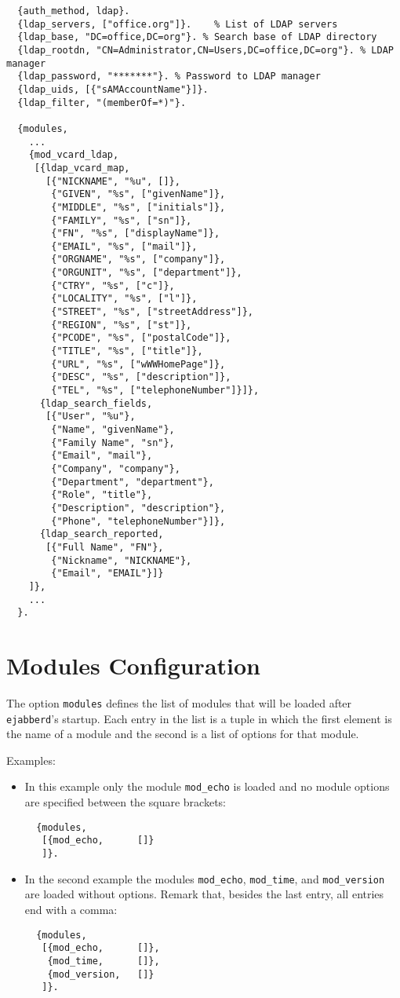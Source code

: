 \documentclass[a4paper,10pt]{book}
\newcommand{\ind}[1]{\begin{latexonly}\index{#1}\end{latexonly}}
\newcommand{\term}[1]{\texttt{#1}}
\newcommand{\ejabberd}{\texttt{ejabberd}}
\newcommand{\module}[1]{\texttt{#1}}
\newcommand{\modecho}{\module{mod\_echo}}
\newcommand{\modtime}{\module{mod\_time}}
\newcommand{\modversion}{\module{mod\_version}}
\begin{document}
\begin{verbatim}
  {auth_method, ldap}.
  {ldap_servers, ["office.org"]}.    % List of LDAP servers
  {ldap_base, "DC=office,DC=org"}. % Search base of LDAP directory
  {ldap_rootdn, "CN=Administrator,CN=Users,DC=office,DC=org"}. % LDAP manager
  {ldap_password, "*******"}. % Password to LDAP manager
  {ldap_uids, [{"sAMAccountName"}]}.
  {ldap_filter, "(memberOf=*)"}.

  {modules,
    ...
    {mod_vcard_ldap,
     [{ldap_vcard_map,
       [{"NICKNAME", "%u", []},
        {"GIVEN", "%s", ["givenName"]},
        {"MIDDLE", "%s", ["initials"]},
        {"FAMILY", "%s", ["sn"]},
        {"FN", "%s", ["displayName"]},
        {"EMAIL", "%s", ["mail"]},
        {"ORGNAME", "%s", ["company"]},
        {"ORGUNIT", "%s", ["department"]},
        {"CTRY", "%s", ["c"]},
        {"LOCALITY", "%s", ["l"]},
        {"STREET", "%s", ["streetAddress"]},
        {"REGION", "%s", ["st"]},
        {"PCODE", "%s", ["postalCode"]},
        {"TITLE", "%s", ["title"]},
        {"URL", "%s", ["wWWHomePage"]},
        {"DESC", "%s", ["description"]},
        {"TEL", "%s", ["telephoneNumber"]}]},
      {ldap_search_fields,
       [{"User", "%u"},
        {"Name", "givenName"},
        {"Family Name", "sn"},
        {"Email", "mail"},
        {"Company", "company"},
        {"Department", "department"},
        {"Role", "title"},
        {"Description", "description"},
        {"Phone", "telephoneNumber"}]},
      {ldap_search_reported,
       [{"Full Name", "FN"},
        {"Nickname", "NICKNAME"},
        {"Email", "EMAIL"}]}
    ]},
    ...
  }.
\end{verbatim}


\section{Modules Configuration}
\label{modules}
\ind{modules}

The option \term{modules} defines the list of modules that will be loaded after
\ejabberd{}'s startup. Each entry in the list is a tuple in which the first
element is the name of a module and the second is a list of options for that
module.

Examples:
\begin{itemize}
\item In this example only the module \modecho{} is loaded and no module
  options are specified between the square brackets:
  \begin{verbatim}
  {modules,
   [{mod_echo,      []}
   ]}.
\end{verbatim}
\item In the second example the modules \modecho{}, \modtime{}, and
  \modversion{} are loaded without options. Remark that, besides the last entry,
  all entries end with a comma:
  \begin{verbatim}
  {modules,
   [{mod_echo,      []},
    {mod_time,      []},
    {mod_version,   []}
   ]}.
\end{verbatim}
\end{itemize}
\end{document}
